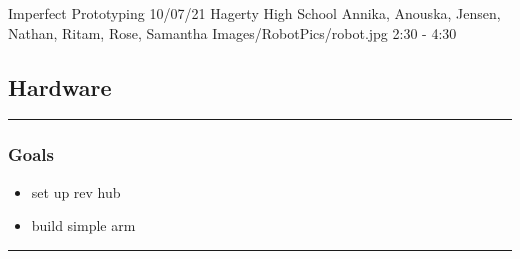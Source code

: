 \insertmeeting 
	{Imperfect Prototyping} 
	{10/07/21}
	{Hagerty High School}
	{Annika, Anouska, Jensen, Nathan, Ritam, Rose, Samantha}
	{Images/RobotPics/robot.jpg}
	{2:30 - 4:30}
	
\subsection*{Hardware}
\noindent\hfil\rule{\textwidth}{.4pt}\hfil
\subsubsection*{Goals}
\begin{itemize}
    \item set up rev hub
    \item build simple arm 

\end{itemize} 

\noindent\hfil\rule{\textwidth}{.4pt}\hfil

